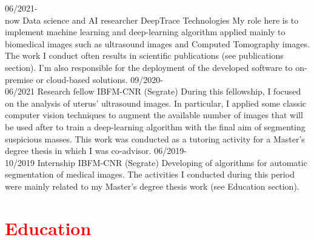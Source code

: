 \documentclass[a4paper]{friggeri-cv}
\begin{document}
\begin{entrylist}
	\entry
	{06/2021-\\now}
	{Data science and AI researcher}
	{DeepTrace Technologies}
	{My role here is to implement machine learning and deep-learning algorithm applied mainly to biomedical images such as ultrasound images and Computed Tomography images. The work I conduct often results in scientific publications (see publications section). I'm also responsible for the deployment of the developed software to on-premise or cloud-based solutions.}
	\entry
	{09/2020-\\06/2021}
	{Research fellow}
	{IBFM-CNR (Segrate)}
	{During this fellowship, I focused on the analysis of uterus' ultrasound images. In particular, I applied some classic computer vision techniques to augment the available number of images that will be used after to train a deep-learning algorithm with the final aim of segmenting suspicious masses. This work was conducted as a tutoring activity for a Master's degree thesis in which I was co-advisor.}
	\entry
	{06/2019-\\10/2019}
	{Internship}
	{IBFM-CNR (Segrate)}
	{Developing of algorithms for automatic segmentation of medical images. The activities I conducted during this period were mainly related to my Master's degree thesis work (see Education section).}
\end{entrylist}

\section{\textcolor{red}{Education}}
\end{document}

